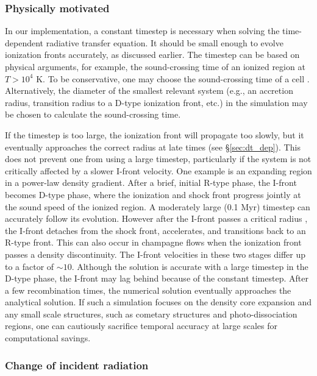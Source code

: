 \documentclass[apj,onecolumn]{emulateapj}
\begin{document}
\subsubsection{Physically motivated}
\label{sec:dt_const}

In our implementation, a constant timestep is necessary when solving
the time-dependent radiative transfer equation.  It should be small
enough to evolve ionization fronts accurately, as discussed earlier.
The timestep can be based on physical arguments, for example, the
sound-crossing time of an ionized region at $T > 10^4$ K.  To be
conservative, one may choose the sound-crossing time of a cell
\citep[e.g.][]{Abel07, Wise08_Gal}.  Alternatively, the diameter of the
smallest relevant system (e.g., an accretion radius, transition radius
to a D-type ionization front, etc.) in the simulation may be chosen to
calculate the sound-crossing time.

If the timestep is too large, the ionization front will propagate too
slowly, but it eventually approaches the correct radius at late times
(see \S\ref{sec:dt_dep}).  This does not prevent one from using a
large timestep, particularly if the system is not critically affected
by a slower I-front velocity.  One example is an expanding 
region in a power-law density gradient.  After a brief, initial R-type
phase, the I-front becomes D-type phase, where the ionization and
shock front progress jointly at the sound speed of the ionized region.
A moderately large (0.1 Myr) timestep can accurately follow its
evolution.  However after the I-front passes a critical radius
\citep{Franco90}, the I-front detaches from the shock front,
accelerates, and transitions back to an R-type front.  This can also
occur in champagne flows when the ionization front passes a density
discontinuity.  The I-front velocities in these two stages differ up
to a factor of $\sim10$.  Although the solution is accurate with a
large timestep in the D-type phase, the I-front may lag behind because
of the constant timestep.  After a few recombination times, the
numerical solution eventually approaches the analytical solution.  If
such a simulation focuses on the density core expansion and any small
scale structures, such as cometary structures and photo-dissociation
regions, one can cautiously sacrifice temporal accuracy at large
scales for computational savings.

\subsubsection{Change of incident radiation}
\label{sec:dt_tau}
\end{document}

